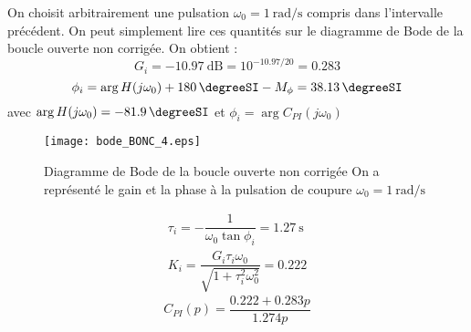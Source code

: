 On choisit arbitrairement une pulsation $\omega_0=\SI{1}{\radian\per\second}$
compris dans l'intervalle précédent.
On peut simplement lire ces quantités sur le diagramme de Bode de la boucle
ouverte non corrigée. On obtient :
\[
    G_i=\SI{-10.97}{\dB}=10^{-10.97/20}=0.283
\]
\[
    \phi_i=\arg{H(j\omega_0)}+\SI{180}{\degreeSI}-M_\phi=\SI{38.13}{\degreeSI}
\]
avec $\arg{H(j\omega_0)}=\SI{-81.9}{\degreeSI}$ et 
$\phi_i=\arg{C_{PI}(j\omega_0)}$
\begin{figure}
    \centering
    \texttt{[image: bode\_BONC\_4.eps]}
    \caption{Diagramme de Bode de la boucle ouverte non corrigée
             On a représenté le gain et la phase à la pulsation de coupure 
             $\omega_0=\SI{1}{\radian\per\second}$}
\end{figure}
\begin{align*}
    \tau_i=-\dfrac{1}{\omega_0\tan\phi_i}=\SI{1.27}{\second}\\
    K_i=\dfrac{G_i\tau_i\omega_0}{\sqrt{1+\tau^2_i\omega^2_0}}=0.222
\end{align*}
\[
    C_{PI}(p)=\dfrac{0.222 + 0.283p}{1.274p}
\]
